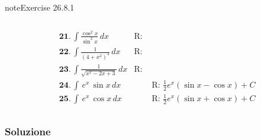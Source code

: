 \documentclass[letterpaper,10pt,italian]{jupyterBook}
\begin{document}
\begin{sphinxadmonition}{note}{Exercise 26.8.1}
\begin{equation*}
\begin{split}
\begin{aligned}
\end{aligned}\end{split}
\end{equation*}\begin{equation*}
\begin{split}\begin{aligned}
 & \mathbf{21.} \,  \int \frac{\cos^2 x}{\sin^3 x} \, dx & \text{R: } \\
 & \mathbf{22.} \,  \int \frac{1}{(4+x^2)^3} \, dx & \text{R: } \\
 & \mathbf{23.} \,  \int \frac{1}{\sqrt{x^2 - 2x + 3}} \, dx & \text{R: } \\
 & \mathbf{24.} \,  \int \, e^x \, \sin x \, dx && \text{R: } \frac{1}{2} e^{x} \left( \sin x - \cos x \right) + C \\
 & \mathbf{25.} \,  \int \, e^x \, \cos x \, dx && \text{R: } \frac{1}{2} e^{x} \left( \sin x + \cos x \right) + C  \\
\end{aligned}\end{split}
\end{equation*}\end{sphinxadmonition}
\subsubsection*{Soluzione}
\end{document}
